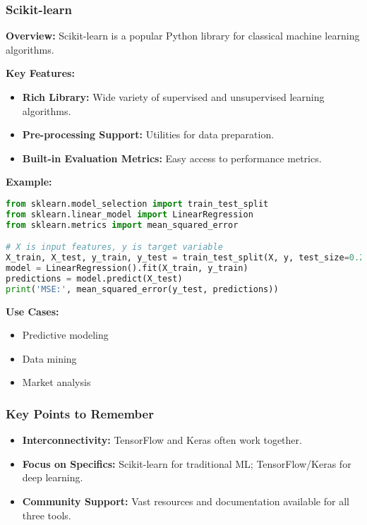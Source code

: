 \documentclass[aspectratio=169]{beamer}
\begin{document}
\begin{frame}[fragile]
    \frametitle{Scikit-learn}
    \textbf{Overview:} Scikit-learn is a popular Python library for classical machine learning algorithms.

    \textbf{Key Features:}
    \begin{itemize}
        \item \textbf{Rich Library:} Wide variety of supervised and unsupervised learning algorithms.
        \item \textbf{Pre-processing Support:} Utilities for data preparation.
        \item \textbf{Built-in Evaluation Metrics:} Easy access to performance metrics.
    \end{itemize}

    \textbf{Example:}
    \begin{lstlisting}[language=Python]
from sklearn.model_selection import train_test_split
from sklearn.linear_model import LinearRegression
from sklearn.metrics import mean_squared_error

# X is input features, y is target variable
X_train, X_test, y_train, y_test = train_test_split(X, y, test_size=0.2)
model = LinearRegression().fit(X_train, y_train)
predictions = model.predict(X_test)
print('MSE:', mean_squared_error(y_test, predictions))
    \end{lstlisting}

    \textbf{Use Cases:}
    \begin{itemize}
        \item Predictive modeling
        \item Data mining
        \item Market analysis
    \end{itemize}
\end{frame}

\begin{frame}
    \frametitle{Key Points to Remember}
    \begin{itemize}
        \item \textbf{Interconnectivity:} TensorFlow and Keras often work together.
        \item \textbf{Focus on Specifics:} Scikit-learn for traditional ML; TensorFlow/Keras for deep learning.
        \item \textbf{Community Support:} Vast resources and documentation available for all three tools.
    \end{itemize}
\end{frame}
\end{document}

